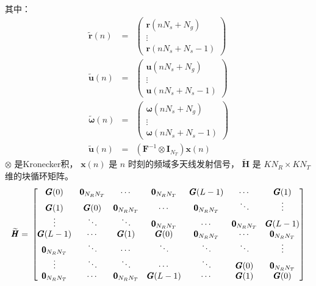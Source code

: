 \documentclass[10pt,a4paper,UTF8]{article}
\begin{document}
其中：
\begin{eqnarray}
  \tilde{\pmb{r}}(n) &=&
  \begin{pmatrix}
    \pmb{r}(nN_s +N_g) \\
    \vdots \\
    \pmb{r}(nN_s +N_s - 1)
  \end{pmatrix}     \nonumber \\
    \tilde{\pmb{u}}(n) &=&
  \begin{pmatrix}
    \pmb{u}(nN_s +N_g) \\
    \vdots \\
    \pmb{u}(nN_s +N_s - 1)
  \end{pmatrix}     \nonumber \\
    \tilde{\pmb{\omega}}(n) &=&
  \begin{pmatrix}
    \pmb{\omega}(nN_s +N_g) \\
    \vdots \\
    \pmb{\omega}(nN_s +N_s - 1)
  \end{pmatrix}     \nonumber \\
   \tilde{\pmb{u}}(n) &=& (\pmb{F}^{-1} \otimes \pmb{I}_{N_T}) \pmb{x}(n) \nonumber
\end{eqnarray}
\(\otimes\)  是Kronecker积， \(\pmb{x}(n)\) 是 \(n\) 时刻的频域多天线发射信号， \(\widetilde{\pmb{H}}\) 是 \(KN_{R} \times KN_T\) 维的块循环矩阵。
\begin{equation}
  \label{eq:channelH}
  \widetilde{\pmb{{H}}} =\\
  \begin{bmatrix}
    \pmb{G}(0)    &  \pmb{0}_{N_RN_T}  & \cdots                         &  \pmb{0}_{N_RN_T}  & \pmb{G}(L-1)         &\cdots                       & \pmb{G}(1)      \\
   \pmb{G}(1)     &  \pmb{G}(0)             & \pmb{0}_{N_RN_T}  &  \cdots                        & \pmb{0}_{N_RN_T}   & \ddots                      & \vdots                \\
    \vdots                &  \ddots                        &  \ddots                        & \pmb{0}_{N_RN_T}   & \cdots                          &\pmb{0}_{N_RN_T} & \pmb{G}(L-1) \\
   \pmb{G}(L-1) &   \cdots                       &\pmb{G}(1)               &\pmb{G}(0)             & \pmb{0}_{N_RN_T}    & \cdots                      &\pmb{0}_{N_RN_T}\\
\pmb{0}_{N_RN_T}& \ddots                       & \cdots                        & \ddots                         &\ddots                           & \ddots                      & \vdots                 \\
 \vdots                    & \ddots                       &\ddots                            & \cdots                        &\ddots                          &\pmb{G}(0)           &\pmb{0}_{N_RN_T}\\
\pmb{0}_{N_RN_T}& \cdots                      &\pmb{0}_{N_RN_T}   & \pmb{G}(L-1)           &\cdots                           &\pmb{G}(1)          & \pmb{G}(0)
  \end{bmatrix}
\end{equation}
\end{document}
